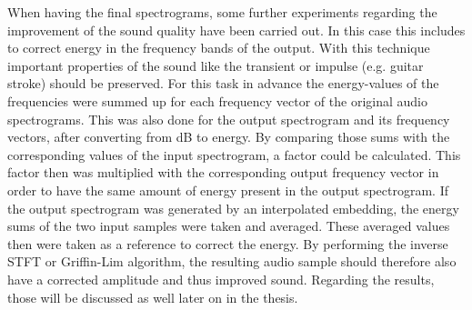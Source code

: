 When having the final spectrograms, some further experiments regarding the improvement of the sound quality have been carried out. In this case this includes to correct energy in the frequency bands of the output. With this technique important properties of the sound like the transient or impulse (e.g. guitar stroke) should be preserved. For this task in advance the energy-values of the frequencies were summed up for each frequency vector of the original audio spectrograms. This was also done for the output spectrogram and its frequency vectors, after converting from dB to energy. By comparing those sums with the corresponding values of the input spectrogram, a factor could be calculated. This factor then was multiplied with the corresponding output frequency vector in order to have the same amount of energy present in the output spectrogram. If the output spectrogram was generated by an interpolated embedding, the energy sums of the two input samples were taken and averaged. These averaged values then were taken as a reference to correct the energy. By performing the inverse STFT or Griffin-Lim algorithm, the resulting audio sample should therefore also have a corrected amplitude and thus improved sound. Regarding the results, those will be discussed as well later on in the thesis.



